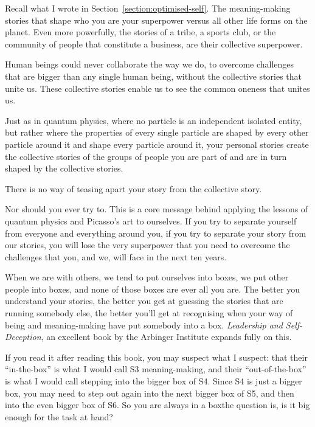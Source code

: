 Recall what I wrote in Section~\ref{section:optimised-self}. The meaning\hyp{}making stories that shape who you are your superpower versus all other life forms on the planet. Even more powerfully, the stories of a tribe, a sports club, or the community of people that constitute a business, are their collective superpower.


Human beings could never collaborate the way we do, to overcome challenges that are bigger than any single human being, without the collective stories that unite us. These collective stories enable us to see the common oneness that unites us. 


Just as in quantum physics, where no particle is an independent isolated entity, but rather where the properties of every single particle are shaped by every other particle around it and shape every particle around it, your personal stories create the collective stories of the groups of people you are part of and are in turn shaped by the collective stories.


There is no way of teasing apart your story from the collective story.


Nor should you ever try to. This is a core message behind applying the lessons of quantum physics and Picasso's  art to ourselves. If you try to separate yourself from everyone and everything around you, if you try to separate your story from our stories, you will lose the very superpower that you need to overcome the challenges that you, and we, will face in the next ten years.


When we are with others, we tend to put ourselves into boxes, we put other people into boxes, and none of those boxes are ever all you are. The better you understand your stories, the better you get at guessing the stories that are running somebody else, the better you'll get at recognising when your way of being and meaning\hyp{}making have put somebody into a box. \emph{Leadership and Self-Deception}, an excellent book\cite{arbinger-leadership} by the Arbinger Institute expands fully on this. 


If you read it after reading this book, you may suspect what I suspect: that their “in-the-box” is what I would call S3 meaning\hyp{}making, and their “out-of-the-box” is what I would call stepping into the bigger box of S4. Since S4 is just a bigger box, you may need to step out again into the next bigger box of S5, and then into the even bigger box of S6. So you are always in a box\textemdash the question is, is it big enough for the task at hand?
